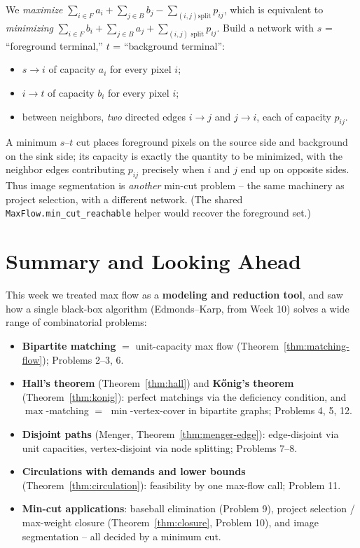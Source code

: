 \documentclass[11pt]{article}
\begin{document}
We \emph{maximize} $\sum_{i \in F} a_i + \sum_{j \in B} b_j - \sum_{(i,j) \text{
split}} p_{ij}$, which is equivalent to \emph{minimizing}
$\sum_{i \in F} b_i + \sum_{j \in B} a_j + \sum_{(i,j) \text{ split}} p_{ij}$.
Build a network with $s$ = ``foreground terminal,'' $t$ = ``background
terminal'':
\begin{itemize}
    \item $s \to i$ of capacity $a_i$ for every pixel $i$;
    \item $i \to t$ of capacity $b_i$ for every pixel $i$;
    \item between neighbors, \emph{two} directed edges $i \to j$ and $j \to i$,
    each of capacity $p_{ij}$.
\end{itemize}
A minimum $s$--$t$ cut places foreground pixels on the source side and background
on the sink side; its capacity is exactly the quantity to be minimized, with the
neighbor edges contributing $p_{ij}$ precisely when $i$ and $j$ end up on
opposite sides. Thus image segmentation is \emph{another} min-cut problem -- the
same machinery as project selection, with a different network. (The shared
\texttt{MaxFlow.min\_cut\_reachable} helper would recover the foreground set.)

\section{Summary and Looking Ahead}

This week we treated max flow as a \textbf{modeling and reduction tool}, and saw
how a single black-box algorithm (Edmonds--Karp, from Week 10) solves a wide
range of combinatorial problems:

\begin{itemize}
    \item \textbf{Bipartite matching} $=$ unit-capacity max flow
    (Theorem~\ref{thm:matching-flow}); Problems 2--3, 6.
    \item \textbf{Hall's theorem} (Theorem~\ref{thm:hall}) and \textbf{K\H{o}nig's
    theorem} (Theorem~\ref{thm:konig}): perfect matchings via the deficiency
    condition, and $\max$-matching $=$ $\min$-vertex-cover in bipartite graphs;
    Problems 4, 5, 12.
    \item \textbf{Disjoint paths} (Menger, Theorem~\ref{thm:menger-edge}):
    edge-disjoint via unit capacities, vertex-disjoint via node splitting;
    Problems 7--8.
    \item \textbf{Circulations with demands and lower bounds}
    (Theorem~\ref{thm:circulation}): feasibility by one max-flow call; Problem 11.
    \item \textbf{Min-cut applications}: baseball elimination (Problem 9),
    project selection / max-weight closure (Theorem~\ref{thm:closure}, Problem
    10), and image segmentation -- all decided by a minimum cut.
\end{itemize}
\end{document}
